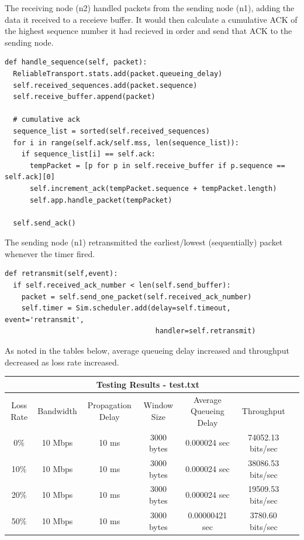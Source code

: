 \documentclass[11pt]{article}
\begin{document}
The receiving node (n2) handled packets from the sending node (n1), adding the data it received to a receieve buffer. It would then calculate a cumulative ACK of the highest sequence number it had recieved in order and send that ACK to the sending node.
\begin{lstlisting}
def handle_sequence(self, packet):
  ReliableTransport.stats.add(packet.queueing_delay)
  self.received_sequences.add(packet.sequence)
  self.receive_buffer.append(packet)

  # cumulative ack
  sequence_list = sorted(self.received_sequences)
  for i in range(self.ack/self.mss, len(sequence_list)):
    if sequence_list[i] == self.ack:
      tempPacket = [p for p in self.receive_buffer if p.sequence == self.ack][0]
      self.increment_ack(tempPacket.sequence + tempPacket.length)
      self.app.handle_packet(tempPacket)
  
  self.send_ack()
\end{lstlisting}

The sending node (n1) retransmitted the earliest/lowest (sequentially) packet whenever the timer fired. 
\begin{lstlisting}
def retransmit(self,event):
  if self.received_ack_number < len(self.send_buffer):
    packet = self.send_one_packet(self.received_ack_number)
    self.timer = Sim.scheduler.add(delay=self.timeout, event='retransmit', 
                                    handler=self.retransmit)
\end{lstlisting}

\vspace{0.5cm}
As noted in the tables below, average queueing delay increased and throughput decreased as loss rate increased.
\begin{center}
\begin{tabular}{ c c c c c c c }
  \multicolumn{6}{c}{Testing Results - test.txt} \\
  \hline
  {\tiny Loss Rate} & {\tiny Bandwidth} & {\tiny Propagation Delay} & {\tiny Window Size} & {\tiny Average Queueing Delay} & {\tiny Throughput}\\
  0\% & 10 Mbps & 10 ms & 3000 bytes & 0.000024 sec & 74052.13 bits/sec \\
  10\% & 10 Mbps & 10 ms & 3000 bytes & 0.000024 sec & 38086.53 bits/sec \\
  20\% & 10 Mbps & 10 ms & 3000 bytes & 0.000024 sec & 19509.53 bits/sec \\
  50\% & 10 Mbps & 10 ms & 3000 bytes & 0.00000421 sec & 3780.60 bits/sec \\
\end{tabular}
\end{center}
\end{document}
